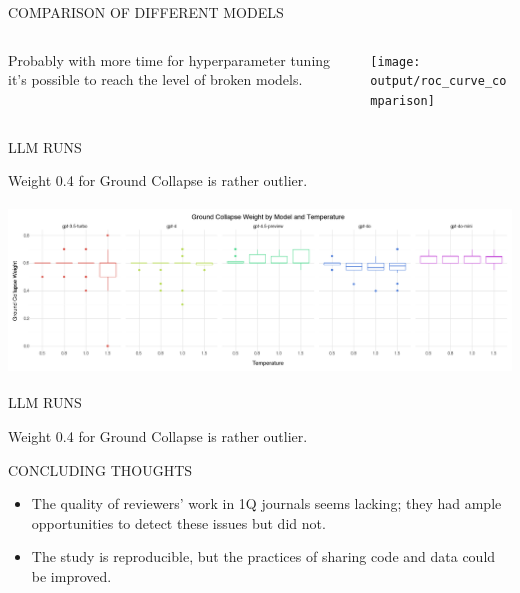 \documentclass[11pt, aspectratio=169]{beamer}
\begin{document}
\begin{frame}{\MakeUppercase{Comparison of different models}}
\begin{columns}[c]
    \begin{column}{.5\textwidth}
        Probably with more time for hyperparameter tuning it's possible to reach the level of broken models.
    \end{column}
    \begin{column}{.5\textwidth}
        \texttt{[image: output/roc\_curve\_comparison]}
    \end{column}
\end{columns}

\end{frame}


\begin{frame}{\MakeUppercase{LLM runs}}

    Weight 0.4 for Ground Collapse is rather outlier.

    \includegraphics[width=14cm,height=4.5cm]{output/llm_ground_collapse_plot}

\end{frame}

\begin{frame}{\MakeUppercase{LLM runs}}

    Weight 0.4 for Ground Collapse is rather outlier.

    

\end{frame}


\begin{frame}{\MakeUppercase{Concluding Thoughts}}

    \begin{itemize}
        \item The quality of reviewers' work in 1Q journals seems lacking; they had ample opportunities to detect these issues but did not.
        \item The study is reproducible, but the practices of sharing code and data could be improved.
    \end{itemize}

\end{frame}
\end{document}
